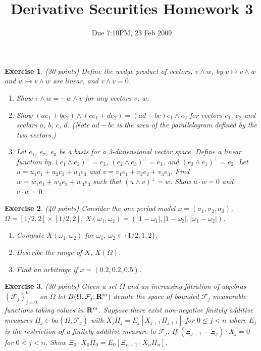 \documentclass[11pt,fleqn]{amsproc}
\newcommand{\R}{{\bf R}}
\newcommand{\F}{\mathcal{F}}
\newtheorem{xca}{Exercise}
\begin{document}
\title{Derivative Securities Homework 3}
\author{Due 7:10PM, 23 Feb 2009}

\maketitle

\begin{xca}{(30 points)}
Define the wedge product of vectors, $v\wedge w$, by
$v\mapsto v\wedge w$ and $w\mapsto v\wedge w$ are linear,
and $v\wedge v = 0$.
\begin{enumerate}
\item Show $v\wedge w = -w\wedge v$ for any vectors $v$, $w$.
\item Show $(a e_1 + b e_2)\wedge (c e_1 + d e_2) = (ad - bc)e_1\wedge e_2$
for vectors $e_1$, $e_2$ and scalars $a$, $b$, $c$, $d$.
(Note $ad - bc$ is the area of the parallelogram defined by the two vectors.)
\item Let $e_1$, $e_2$, $e_3$ be a basis for a 3-dimensional vector space.
Define a linear function by $(e_1\wedge e_2)^\perp = e_3$,
$(e_2\wedge e_3)^\perp = e_1$, and $(e_3\wedge e_1)^\perp = e_2$. 
Let $u = u_1 e_1 + u_2 e_2 + u_3 e_3$ and $v = v_1 e_1 + v_2 e_2 + v_3 e_3$.
Find $w = w_1 e_1 + w_2 e_2 + w_3 e_3$ such that $(u\wedge v)^\perp = w$.
Show $u\cdot w = 0$ and $v\cdot w = 0$.
\end{enumerate}
\end{xca}

\begin{xca}{(40 points)}
Consider the one period model $x = (\sigma_1, \sigma_2, \sigma_3)$,
$\Omega = [1/2,2] \times [1/2, 2]$, $X(\omega_1, \omega_2)
= (|1 - \omega_1|, |1 - \omega_2|, |\omega_1 - \omega_2|)$.
\begin{enumerate}
\item Compute $X(\omega_1,\omega_2)$ for $\omega_1$, $\omega_2 \in \{1/2,1,2\}$.
\item Describe the range of $X$, $X(\Omega)$.
\item Find an arbitrage if $x = (0.2, 0.2, 0.5)$.
\end{enumerate}
\end{xca}

\begin{xca}{(30 points)}
Given a set $\Omega$ and an increasing filtration of algebras
$(\F_j)_{j=0}^n$ on $\Omega$ let $B(\Omega,\F_j,\R^m)$ denote
the space of bounded $\F_j$ measurable functions taking values in $\R^m$.
Suppose there exist non-negative finitely additive measures
$\Pi_j\in ba(\Omega,\F_j)$ with $X_j\Pi_j = E_j[X_{j+1}\Pi_{j+1}]$
for $0\le j < n$ where $E_j$ is the restriction of a finitely
additive measure to $\F_j$.
If $(\Xi_{j - 1} - \Xi_j)\cdot X_j = 0$
for $0 < j < n$. Show $\Xi_0\cdot X_0\Pi_0 = E_0[\Xi_{n-1}\cdot X_n\Pi_n]$.
\end{xca}
\end{document}
